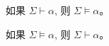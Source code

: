 \begin{frame}{}
  \begin{theorem}
    如果 $\Sigma \vdash \alpha$, 则 $\Sigma \models \alpha$。
  \end{theorem}

  \pause
  \vspace{0.60cm}

  \begin{theorem}
    如果 $\Sigma \models \alpha$, 则 $\Sigma \vdash \alpha$。
  \end{theorem}
\end{frame}

%

